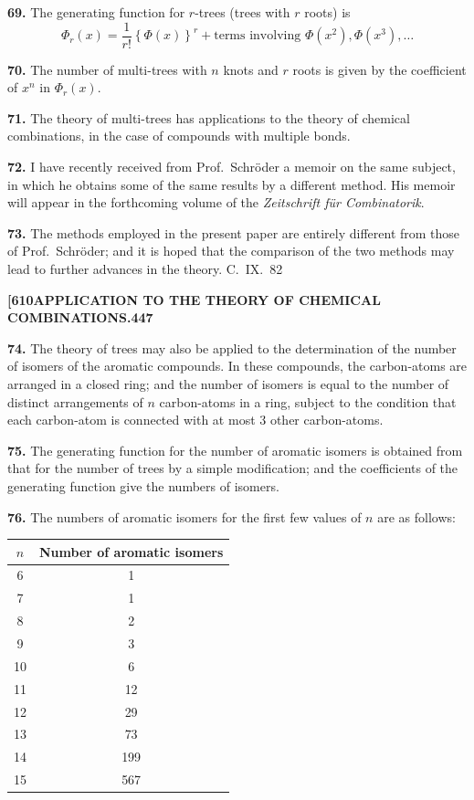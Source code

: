 \documentclass[11pt,a4paper]{book}
\begin{document}
{\medskip
\noindent\textbf{69.}
The generating function for $r$-trees (trees with $r$ roots) is
\[
\Phi_r(x) = \frac{1}{r!} \left\{\Phi(x)\right\}^r + \text{terms involving } \Phi(x^2), \Phi(x^3), \ldots
\]

\medskip
\noindent\textbf{70.}
The number of multi-trees with $n$ knots and $r$ roots is given by the coefficient of $x^n$ in $\Phi_r(x)$.

\medskip
\noindent\textbf{71.}
The theory of multi-trees has applications to the theory of chemical combinations, in the case of compounds with multiple bonds.

\medskip
\noindent\textbf{72.}
I have recently received from Prof.~Schr\"{o}der a memoir on the same subject, in which he obtains some of the same results by a different method. His memoir will appear in the forthcoming volume of the \textit{Zeitschrift f\"{u}r Combinatorik}.

\medskip
\noindent\textbf{73.}
The methods employed in the present paper are entirely different from those of Prof.~Schr\"{o}der; and it is hoped that the comparison of the two methods may lead to further advances in the theory.
\hfill C.~IX.\ 82

\newpage
\noindent\textbf{[610}\hspace{\fill}\textbf{APPLICATION TO THE THEORY OF CHEMICAL COMBINATIONS.}\hspace{\fill}\textbf{447}

\noindent\textbf{74.}
The theory of trees may also be applied to the determination of the number of isomers of the aromatic compounds. In these compounds, the carbon-atoms are arranged in a closed ring; and the number of isomers is equal to the number of distinct arrangements of $n$ carbon-atoms in a ring, subject to the condition that each carbon-atom is connected with at most 3 other carbon-atoms.

\medskip
\noindent\textbf{75.}
The generating function for the number of aromatic isomers is obtained from that for the number of trees by a simple modification; and the coefficients of the generating function give the numbers of isomers.

\medskip
\noindent\textbf{76.}
The numbers of aromatic isomers for the first few values of $n$ are as follows:

\begin{center}
\begin{tabular}{|c|c|}
\hline
$n$ & Number of aromatic isomers \\
\hline
6 & 1 \\
7 & 1 \\
8 & 2 \\
9 & 3 \\
10 & 6 \\
11 & 12 \\
12 & 29 \\
13 & 73 \\
14 & 199 \\
15 & 567 \\
\hline
\end{tabular}
\end{center}

}
\end{document}
